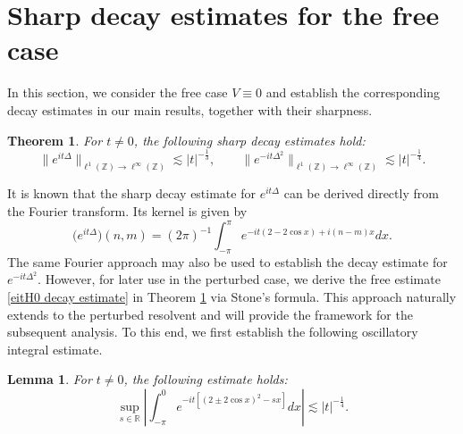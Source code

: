 \documentclass[reqno, 11pt]{amsart}
\newtheorem{theorem}[definition]{Theorem}
\newtheorem{lemma}[definition]{Lemma}
\newcommand\R{\mathbb{R}}
\newcommand\Z{\mathbb{Z}}
\numberwithin{equation}{section}
\begin{document}
\section{Sharp decay estimates for the free case}\label{Sec of decay for free}
In this section, we consider the free case $V\equiv0$ and establish the corresponding decay estimates in our main results, together with their sharpness.
\begin{theorem}\label{D-E for free case}
{ For $t\neq0$, the following sharp decay estimates hold:
\begin{equation}\label{eitH0 decay estimate}
\|e^{it\Delta}\|_{\ell^1(\Z )\rightarrow\ell^{\infty}(\Z )}\lesssim |t|^{-\frac{1}{3}} ,\qquad\big\|e^{-it\Delta^2}\big\|_{\ell^1(\Z )\rightarrow\ell^{\infty}(\Z )}\lesssim|t|^{-\frac{1}{4}}.
\end{equation}
}
\end{theorem}
It is known that the sharp decay estimate for $e^{it\Delta}$ can be derived directly from the Fourier transform. Its kernel is given by
  \begin{equation*}
\big(e^{it\Delta}\big)(n,m)=(2\pi)^{-1}\int_{-\pi}^{\pi}e^{-it(2-2\cos x)+i(n-m)x}dx.
 \end{equation*}
The same Fourier approach may also be used to establish the decay estimate for $e^{-it\Delta^2}$. However, for later use in the perturbed case, we derive the free estimate \eqref{eitH0 decay estimate} in Theorem \ref{D-E for free case} via Stone's formula. This approach naturally extends to the perturbed resolvent and will provide the framework for the subsequent analysis. To this end, we first establish the following oscillatory integral estimate.
\begin{lemma}\label{Von der}
{ For $t\neq0$, the following estimate holds:}
\begin{equation}\label{von der esti}
\sup\limits_{s\in\R}\left|\int_{-\pi}^{0}e^{-it\left[(2\pm2\cos x)^2-sx\right]}dx\right|\lesssim |t|^{-\frac{1}{4}}.
\end{equation}
\end{lemma}
\end{document}
